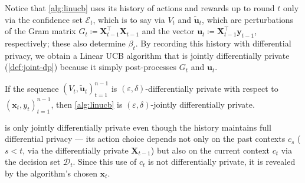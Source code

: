 \documentclass{article}
\renewcommand{\vec}[1]{\bm{#1}}
\newcommand{\defeq}{\coloneq}
\newcommand{\D}{\mathcal{D}}
\newcommand{\E}{\mathcal{E}}
\providecommand\transp{\top}
\let\transpsymbol\transp
\renewcommand{\transp}[1]{#1^\transpsymbol}
\newcommand{\XtX}[1]{\transp{#1}{#1}}
\begin{document}
Notice that \cref{alg:linucb} uses its history of actions and rewards
up to round $t$ only via the confidence set $\E_t$, which is to say
via $V_t$ and $\tilde{\vec u}_t$, which are perturbations of the Gram
matrix $G_t\defeq\XtX{\vec X_{t-1}}$ and the vector
$\vec u_t \defeq \transp{\vec X_{t-1}} \vec y_{t-1}$, respectively;
these also determine $\beta_t$.  By recording this history with
differential privacy, we obtain a Linear UCB algorithm that is jointly
differentially private (\cref{def:joint-dp}) because it simply
post-processes $G_t$ and $\vec u_t$.

\begin{claim}
  If the sequence $(V_t,\tilde{\vec u}_t)_{t=1}^{n-1}$ is
  $(\varepsilon,\delta)$-differentially private with respect to
  $(\vec x_t, y_t)_{t=1}^{n-1}$, then \cref{alg:linucb} is
  $(\varepsilon,\delta)$-jointly differentially private.
\end{claim}

\begin{remark}
   is only jointly differentially private even though
  the history maintains full differential privacy --- its action
  choice depends not only on the past contexts $c_s$ ($s < t$, via the
  differentially private $\vec X_{t-1}$) but also on the current
  context $c_t$ via the decision set $\D_t$.  Since this use of $c_t$
  is not differentially private, it is revealed by the algorithm's
  chosen $\vec x_t$.
\end{remark}
\end{document}

